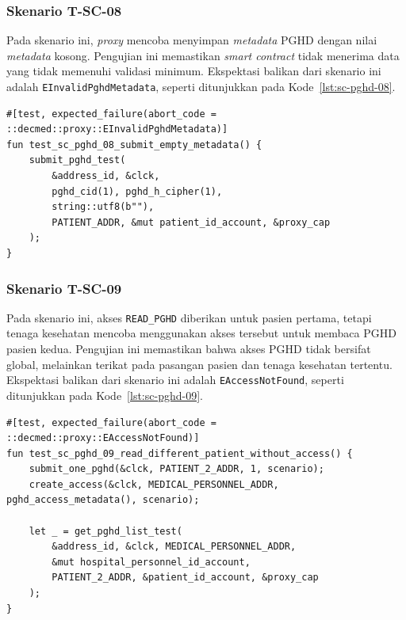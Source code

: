 \subsubsection{Skenario T-SC-08}

Pada skenario ini, \textit{proxy} mencoba menyimpan \textit{metadata} PGHD dengan nilai \textit{metadata} kosong.
Pengujian ini memastikan \textit{smart contract} tidak menerima data yang tidak memenuhi validasi minimum.
Ekspektasi balikan dari skenario ini adalah \texttt{EInvalidPghdMetadata}, seperti ditunjukkan pada Kode~\ref{lst:sc-pghd-08}.

\begin{lstlisting}[caption={Pengujian submit metadata PGHD kosong}, label={lst:sc-pghd-08}, float=htb]
#[test, expected_failure(abort_code = ::decmed::proxy::EInvalidPghdMetadata)]
fun test_sc_pghd_08_submit_empty_metadata() {
    submit_pghd_test(
        &address_id, &clck,
        pghd_cid(1), pghd_h_cipher(1),
        string::utf8(b""),
        PATIENT_ADDR, &mut patient_id_account, &proxy_cap
    );
}
\end{lstlisting}

\subsubsection{Skenario T-SC-09}

Pada skenario ini, akses \texttt{READ\_PGHD} diberikan untuk pasien pertama, tetapi tenaga kesehatan mencoba menggunakan akses tersebut untuk membaca PGHD pasien kedua.
Pengujian ini memastikan bahwa akses PGHD tidak bersifat global, melainkan terikat pada pasangan pasien dan tenaga kesehatan tertentu.
Ekspektasi balikan dari skenario ini adalah \texttt{EAccessNotFound}, seperti ditunjukkan pada Kode~\ref{lst:sc-pghd-09}.

\begin{lstlisting}[caption={Pengujian akses PGHD untuk pasien yang berbeda}, label={lst:sc-pghd-09}, float=htb]
#[test, expected_failure(abort_code = ::decmed::proxy::EAccessNotFound)]
fun test_sc_pghd_09_read_different_patient_without_access() {
    submit_one_pghd(&clck, PATIENT_2_ADDR, 1, scenario);
    create_access(&clck, MEDICAL_PERSONNEL_ADDR, pghd_access_metadata(), scenario);

    let _ = get_pghd_list_test(
        &address_id, &clck, MEDICAL_PERSONNEL_ADDR,
        &mut hospital_personnel_id_account,
        PATIENT_2_ADDR, &patient_id_account, &proxy_cap
    );
}
\end{lstlisting}

